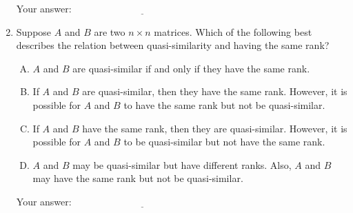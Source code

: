 \documentclass[10pt]{amsart}
\begin{document}
\begin{enumerate}
  \vspace{0.1in}
  Your answer: $\underline{\qquad\qquad\qquad\qquad\qquad\qquad\qquad}$
  \vspace{0.1in}

\item Suppose $A$ and $B$ are two $n \times n$ matrices. Which of the
  following best describes the relation between quasi-similarity and having
  the same rank?

  \begin{enumerate}[(A)]
  \item $A$ and $B$ are quasi-similar if and only if they have the same rank.
  \item If $A$ and $B$ are quasi-similar, then they have the same
    rank. However, it is possible for $A$ and $B$ to have the same
    rank but not be quasi-similar.
  \item If $A$ and $B$ have the same rank, then they are
    quasi-similar. However, it is possible for $A$ and $B$ to be
    quasi-similar but not have the same rank.
  \item $A$ and $B$ may be quasi-similar but have different ranks. Also, $A$
    and $B$ may have the same rank but not be quasi-similar.
  \end{enumerate}

  \vspace{0.1in}
  Your answer: $\underline{\qquad\qquad\qquad\qquad\qquad\qquad\qquad}$
  \vspace{0.1in}

\end{enumerate}
\end{document}
